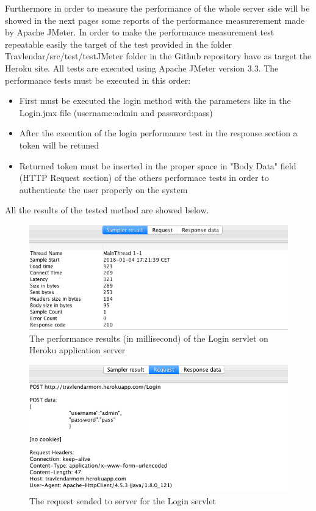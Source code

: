 \documentclass[numbers=noenddot, 12pt, a4paper, oneside]{scrbook}
\begin{document}
Furthermore in order to measure the performance of the whole server side will be showed in the next pages some reports of the performance measurerement made by Apache JMeter.
In order to make the performance measurement test repeatable easily the target of the test provided in the folder Travlendar/src/test/testJMeter folder in the Github repository have as target the Heroku site.
All tests are executed using Apache JMeter version 3.3.
The performance tests must be executed in this order:
\begin{itemize}
	\item First must be executed the login method with the parameters like in the Login.jmx file (username:admin and password:pass)
	\item After the execution of the login performance test in the response section a token will be retuned
	\item Returned token must be inserted in the proper space in "Body Data" field (HTTP Request section) of the others performace tests in order to authenticate the user properly on the system 
\end{itemize}

All the results of the tested method are showed below.\\\newline

\begin{figure}[H]
	\centering
	\includegraphics[width=1.1\textwidth]{Test/LoginMain}
	\caption{The performance results (in millisecond) of the Login servlet on Heroku application server}
\end{figure}

\begin{figure}[H]
\centering
\includegraphics[width=1.1\textwidth]{Test/LoginReq}
\caption{The request sended to server for the Login servlet}
\end{figure}
\end{document}
